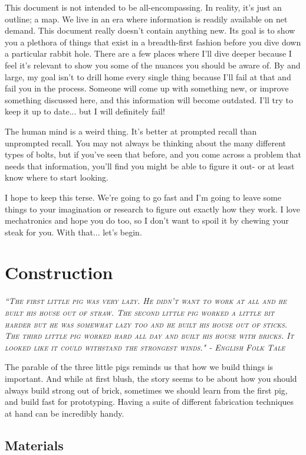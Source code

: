 \documentclass[10pt,letterpaper]{book}
\begin{document}
This document is not intended to be all-encompassing. In reality, it's just an outline; a map. We live in an era where information is readily available on net demand. This document really doesn't contain anything new. Its goal is to show you a plethora of things that exist in a breadth-first fashion before you dive down a particular rabbit hole. There are a few places where I'll dive deeper because I feel it's relevant to show you some of the nuances you should be aware of. By and large, my goal isn't to drill home every single thing because I'll fail at that and fail you in the process. Someone will come up with something new, or improve something discussed here, and this information will become outdated. I'll try to keep it up to date... but I will definitely fail!

The human mind is a weird thing. It's better at prompted recall than unprompted recall. You may not always be thinking about the many different types of bolts, but if you've seen that before, and you come across a problem that needs that information, you'll find you might be able to figure it out- or at least know where to start looking.

I hope to keep this terse. We're going to go fast and I'm going to leave some things to your imagination or research to figure out exactly how they work. I love mechatronics and hope you do too, so I don't want to spoil it by chewing your steak for you. With that... let's begin.

\chapter{Construction}
 
 {\slshape \scshape ``The first little pig was very lazy. He didn't want to work at all and he built his house out of straw. The second little pig worked a little bit harder but he was somewhat lazy too and he built his house out of sticks. The third little pig worked hard all day and built his house with bricks. It looked like it could withstand the strongest winds." - English Folk Tale}
 
 The parable of the three little pigs reminds us that how we build things is important. And while at first blush, the story seems to be about how you should always build strong out of brick, sometimes we should learn from the first pig, and build fast for prototyping. Having a suite of different fabrication techniques at hand can be incredibly handy.
 
 \section{Materials}
 
\end{document}
